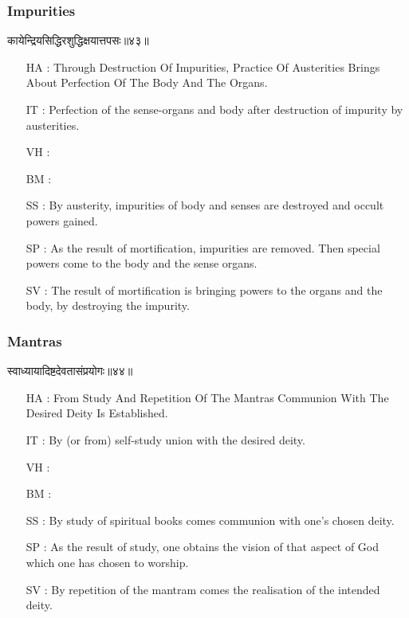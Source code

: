 \begin{frame}[fragile]\frametitle{Impurities}
\begin{sanskrit}
कायेन्द्रियसिद्धिरशुद्धिक्षयात्तपसः॥४३॥
\end{sanskrit}

	\begin{itemize}
	\item [HA]: Through Destruction Of Impurities, Practice Of Austerities Brings About Perfection Of The Body And The Organs.
	\item [IT]: Perfection of the sense-organs and body after destruction of impurity by austerities.
	\item [VH]: 
	\item [BM]: 
	\item [SS]: By austerity, impurities of body and senses are destroyed and occult powers gained.
	\item [SP]: As the result of mortification, impurities are removed. Then special powers come to the body and the sense organs.
	\item [SV]: The result of mortification is bringing powers to the organs and the body, by destroying the impurity. 
	\end{itemize}
\end{frame}


\begin{frame}[fragile]\frametitle{Mantras}
\begin{sanskrit}
स्वाध्यायादिष्टदेवतासंप्रयोगः॥४४॥
\end{sanskrit}

	\begin{itemize}
	\item [HA]: From Study And Repetition Of The Mantras Communion With The Desired Deity Is Established.
	\item [IT]: By (or from) self-study union with the desired deity.
	\item [VH]: 
	\item [BM]: 
	\item [SS]: By study of spiritual books comes communion with one’s chosen deity.
	\item [SP]: As the result of study, one obtains the vision of that aspect of God which one has chosen to worship.
	\item [SV]: By repetition of the mantram comes the realisation of the intended deity. 
	\end{itemize}
\end{frame}


